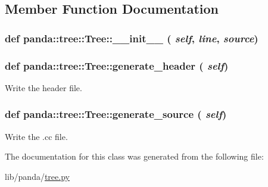 \subsection{Member Function Documentation}
\hypertarget{classpanda_1_1tree_1_1Tree_acc8d04b826b0ee03d596a6b5246920c9}{
\subsubsection[{\_\-\_\-init\_\-\_\-}]{\setlength{\rightskip}{0pt plus 5cm}def panda::tree::Tree::\_\-\_\-init\_\-\_\- ( {\em self}, \/   {\em line}, \/   {\em source})}}
\label{classpanda_1_1tree_1_1Tree_acc8d04b826b0ee03d596a6b5246920c9}
\hypertarget{classpanda_1_1tree_1_1Tree_ae3befaaeb4bbbba83cac85bdf740013d}{
\subsubsection[{generate\_\-header}]{\setlength{\rightskip}{0pt plus 5cm}def panda::tree::Tree::generate\_\-header ( {\em self})}}
\label{classpanda_1_1tree_1_1Tree_ae3befaaeb4bbbba83cac85bdf740013d}
\begin{DoxyVerb}
Write the header file.
\end{DoxyVerb}
 \hypertarget{classpanda_1_1tree_1_1Tree_a3a131456cf1be55058e137df7843e9d4}{
\subsubsection[{generate\_\-source}]{\setlength{\rightskip}{0pt plus 5cm}def panda::tree::Tree::generate\_\-source ( {\em self})}}
\label{classpanda_1_1tree_1_1Tree_a3a131456cf1be55058e137df7843e9d4}
\begin{DoxyVerb}
Write the .cc file.
\end{DoxyVerb}
 

The documentation for this class was generated from the following file:\begin{DoxyCompactItemize}
\item 
lib/panda/\hyperlink{tree_8py}{tree.py}\end{DoxyCompactItemize}

